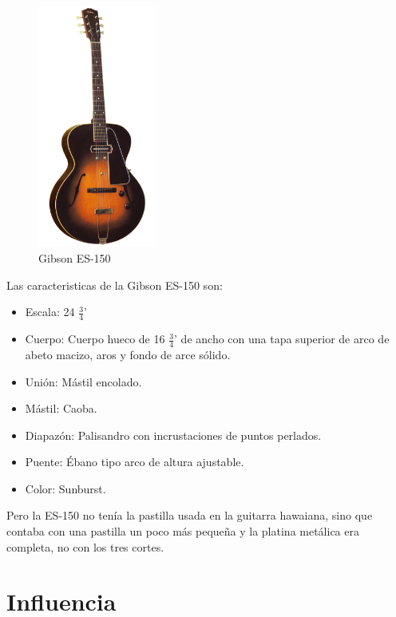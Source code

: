 \documentclass{article}
\begin{document}
\begin{figure}
    \centering
    \includegraphics[width=0.35\textwidth]{images/es-150.png}
    \vspace{-5pt}
    \caption{Gibson ES-150}
\end{figure}

Las caracteristicas de la Gibson ES-150 son:

\begin{itemize}
    \item Escala: 24 \(\frac{3}{4}\)'
    \item Cuerpo: Cuerpo hueco de 16 \(\frac{3}{4}\)' de ancho con una tapa superior de arco de abeto macizo, aros y fondo de arce sólido.
    \item Unión: Mástil encolado.
    \item Mástil: Caoba.
    \item Diapazón: Palisandro con incrustaciones de puntos perlados.
    \item Puente: Ébano tipo arco de altura ajustable.
    \item Color: Sunburst.
\end{itemize}

Pero la ES-150 no tenía la pastilla usada en la guitarra hawaiana, sino que contaba con una pastilla un poco más pequeña y la platina metálica era completa, no con los tres cortes.\\

\endgroup

\section{Influencia}
\end{document}
